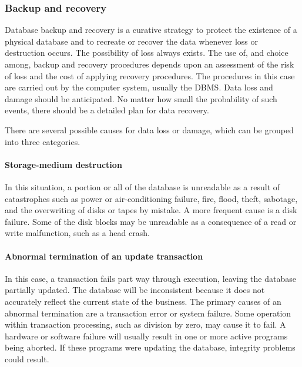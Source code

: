 \documentclass[
]{article}
\begin{document}
\hypertarget{backup-and-recovery}{%
\subsubsection*{Backup and recovery}\label{backup-and-recovery}}

Database backup and recovery is a curative strategy to protect the
existence of a physical database and to recreate or recover the data
whenever loss or destruction occurs. The possibility of loss always
exists. The use of, and choice among, backup and recovery procedures
depends upon an assessment of the risk of loss and the cost of applying
recovery procedures. The procedures in this case are carried out by the
computer system, usually the DBMS. Data loss and damage should be
anticipated. No matter how small the probability of such events, there
should be a detailed plan for data recovery.

There are several possible causes for data loss or damage, which can be
grouped into three categories.

\hypertarget{storage-medium-destruction}{%
\paragraph*{Storage-medium destruction}\label{storage-medium-destruction}}

In this situation, a portion or all of the database is unreadable as a
result of catastrophes such as power or air-conditioning failure, fire,
flood, theft, sabotage, and the overwriting of disks or tapes by
mistake. A more frequent cause is a disk failure. Some of the disk
blocks may be unreadable as a consequence of a read or write
malfunction, such as a head crash.

\hypertarget{abnormal-termination-of-an-update-transaction}{%
\paragraph*{Abnormal termination of an update transaction}\label{abnormal-termination-of-an-update-transaction}}

In this case, a transaction fails part way through execution, leaving
the database partially updated. The database will be inconsistent
because it does not accurately reflect the current state of the
business. The primary causes of an abnormal termination are a
transaction error or system failure. Some operation within transaction
processing, such as division by zero, may cause it to fail. A hardware
or software failure will usually result in one or more active programs
being aborted. If these programs were updating the database, integrity
problems could result.
\end{document}
